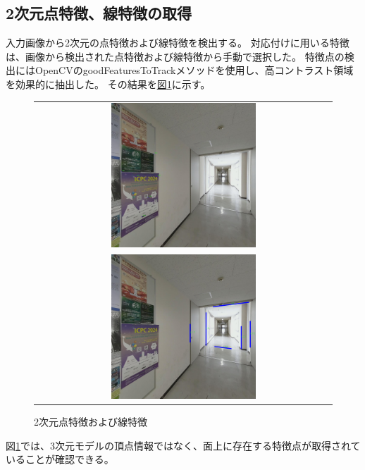 \documentclass[]{jarticle}          %
\begin{document}
\subsection{2次元点特徴、線特徴の取得}
入力画像から2次元の点特徴および線特徴を検出する。
対応付けに用いる特徴は、画像から検出された点特徴および線特徴から手動で選択した。
特徴点の検出にはOpenCVのgoodFeaturesToTrackメソッドを使用し、高コントラスト領域を効果的に抽出した。
その結果を\hyperref[four]{図\ref{four}}に示す。
\begin{figure}[H]
  \begin{center}
    \begin{tabular}{c}
      \includegraphics[width=0.5\textwidth]{figures/points1.png}\\
      \includegraphics[width=0.5\textwidth]{figures/lines.png}
    \end{tabular}
  \end{center}
  \caption{2次元点特徴および線特徴}
  \label{four}
\end{figure}
図\ref{four}では、3次元モデルの頂点情報ではなく、面上に存在する特徴点が取得されていることが確認できる。
\end{document}
